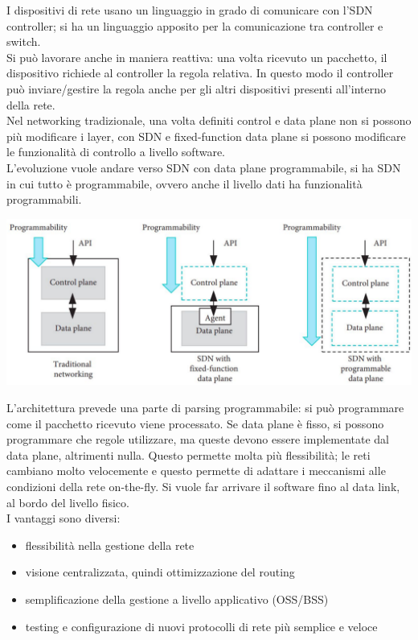 I dispositivi di rete usano un linguaggio in grado di comunicare con l'SDN controller; si ha un linguaggio apposito per la comunicazione tra controller e switch.\\
Si può lavorare anche in maniera reattiva: una volta ricevuto un pacchetto, il dispositivo richiede al controller la regola relativa. In questo modo il controller può inviare/gestire la regola anche per gli altri dispositivi presenti all'interno della rete.\\

Nel networking tradizionale, una volta definiti control e data plane non si possono più modificare i layer, con SDN e fixed-function data plane si possono modificare le funzionalità di controllo a livello software. \\

L'evoluzione vuole andare verso SDN con data plane programmabile, si ha SDN in cui tutto è programmabile, ovvero anche il livello dati ha funzionalità programmabili.
\begin{center}
	\includegraphics[width=0.85\linewidth]{img/5g/sdn2}
\end{center}
L'architettura prevede una parte di parsing programmabile: si può programmare come il pacchetto ricevuto viene processato. Se data plane è fisso, si possono programmare che regole utilizzare, ma queste devono essere implementate dal data plane, altrimenti nulla. Questo permette molta più flessibilità; le reti cambiano molto velocemente e questo permette di adattare i meccanismi alle condizioni della rete on-the-fly. Si vuole far arrivare il software fino al data link, al bordo del livello fisico.\\

I vantaggi sono diversi:
\begin{itemize}
	\item flessibilità nella gestione della rete
	\item visione centralizzata, quindi ottimizzazione del routing
	\item semplificazione della gestione a livello applicativo (OSS/BSS)
	\item testing e configurazione di nuovi protocolli di rete più semplice e veloce
\end{itemize}

